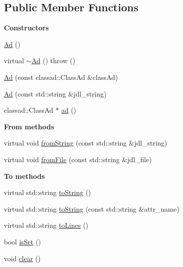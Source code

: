 \subsection*{Public Member Functions}
\begin{Indent}{\bf Constructors}\par
\begin{CompactItemize}
\item 
\hyperlink{classglite_1_1wms_1_1jdl_1_1Ad_z11_0}{Ad} ()
\item 
virtual \hyperlink{classglite_1_1wms_1_1jdl_1_1Ad_z11_1}{$\sim$Ad} ()  throw ()
\item 
\hyperlink{classglite_1_1wms_1_1jdl_1_1Ad_z11_2}{Ad} (const classad::Class\-Ad \&class\-Ad)
\item 
\hyperlink{classglite_1_1wms_1_1jdl_1_1Ad_z11_3}{Ad} (const std::string \&jdl\_\-string)
\item 
classad::Class\-Ad $\ast$ \hyperlink{classglite_1_1wms_1_1jdl_1_1Ad_z11_4}{ad} ()
\end{CompactItemize}
\end{Indent}
\begin{Indent}{\bf From methods}\par
\begin{CompactItemize}
\item 
virtual void \hyperlink{classglite_1_1wms_1_1jdl_1_1Ad_z13_0}{from\-String} (const std::string \&jdl\_\-string)
\item 
virtual void \hyperlink{classglite_1_1wms_1_1jdl_1_1Ad_z13_1}{from\-File} (const std::string \&jdl\_\-file)
\end{CompactItemize}
\end{Indent}
\begin{Indent}{\bf To methods}\par
\begin{CompactItemize}
\item 
virtual std::string \hyperlink{classglite_1_1wms_1_1jdl_1_1Ad_z15_0}{to\-String} ()
\item 
virtual std::string \hyperlink{classglite_1_1wms_1_1jdl_1_1Ad_z15_1}{to\-String} (const std::string \&attr\_\-name)
\item 
virtual std::string \hyperlink{classglite_1_1wms_1_1jdl_1_1Ad_z15_2}{to\-Lines} ()
\item 
bool \hyperlink{classglite_1_1wms_1_1jdl_1_1Ad_z15_3}{is\-Set} ()
\item 
void \hyperlink{classglite_1_1wms_1_1jdl_1_1Ad_z15_4}{clear} ()
\end{CompactItemize}
\end{Indent}
